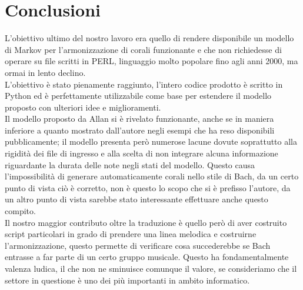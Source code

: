 \chapter{Conclusioni}\label{ch:conclusions}
L'obiettivo ultimo del nostro lavoro era quello di rendere disponibile un modello di Markov per l'armonizzazione di corali funzionante e che non richiedesse di operare su file scritti in PERL, linguaggio molto popolare fino agli anni 2000, ma ormai in lento declino.\\
L'obiettivo è stato pienamente raggiunto, l'intero codice prodotto è scritto in Python ed è perfettamente utilizzabile come base per estendere il modello proposto con ulteriori idee e miglioramenti.\\
Il modello proposto da Allan si è rivelato funzionante, anche se in maniera inferiore a quanto mostrato dall'autore negli esempi che ha reso disponibili pubblicamente; il modello presenta però numerose lacune dovute soprattutto alla rigidità dei file di ingresso e alla scelta di non integrare alcuna informazione riguardante la durata delle note negli stati del modello. Questo causa l'impossibilità di generare automaticamente corali nello stile di Bach, da un certo punto di vista ciò è corretto, non è questo lo scopo che si è prefisso l'autore, da un altro punto di vista sarebbe stato interessante effettuare anche questo compito.\\
Il nostro maggior contributo oltre la traduzione è quello però di aver costruito script particolari in grado di prendere una linea melodica e costruirne l'armonizzazione, questo permette di verificare cosa succederebbe se Bach entrasse a far parte di un certo gruppo musicale. Questo ha fondamentalmente valenza ludica, il che non ne sminuisce comunque il valore, se consideriamo che il settore in questione è uno dei più importanti in ambito informatico.